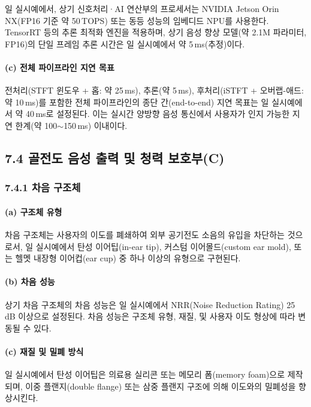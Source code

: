 \documentclass{article}
\begin{document}
일 실시예에서, 상기 신호처리·AI 연산부의 프로세서는 NVIDIA Jetson Orin NX(FP16 기준 약 50\,TOPS) 또는 동등 성능의 임베디드 NPU를 사용한다. TensorRT 등의 추론 최적화 엔진을 적용하며, 상기 음성 향상 모델(약 2.1M 파라미터, FP16)의 단일 프레임 추론 시간은 일 실시예에서 약 5\,ms(추정)이다.

\paragraph{(c) 전체 파이프라인 지연 목표}

전처리(STFT 윈도우 + 홉: 약 25\,ms), 추론(약 5\,ms), 후처리(iSTFT + 오버랩-애드: 약 10\,ms)를 포함한 전체 파이프라인의 종단 간(end-to-end) 지연 목표는 일 실시예에서 약 40\,ms로 설정된다. 이는 실시간 양방향 음성 통신에서 사용자가 인지 가능한 지연 한계(약 100$\sim$150\,ms) 이내이다.

\subsection{7.4 골전도 음성 출력 및 청력 보호부(C)}

\subsubsection{7.4.1 차음 구조체}

\paragraph{(a) 구조체 유형}

차음 구조체는 사용자의 이도를 폐쇄하여 외부 공기전도 소음의 유입을 차단하는 것으로서, 일 실시예에서 탄성 이어팁(in-ear tip), 커스텀 이어몰드(custom ear mold), 또는 헬멧 내장형 이어컵(ear cup) 중 하나 이상의 유형으로 구현된다.

\paragraph{(b) 차음 성능}

상기 차음 구조체의 차음 성능은 일 실시예에서 NRR(Noise Reduction Rating) 25\,dB 이상으로 설정된다. 차음 성능은 구조체 유형, 재질, 및 사용자 이도 형상에 따라 변동될 수 있다.

\paragraph{(c) 재질 및 밀폐 방식}

일 실시예에서 탄성 이어팁은 의료용 실리콘 또는 메모리 폼(memory foam)으로 제작되며, 이중 플랜지(double flange) 또는 삼중 플랜지 구조에 의해 이도와의 밀폐성을 향상시킨다.
\end{document}
